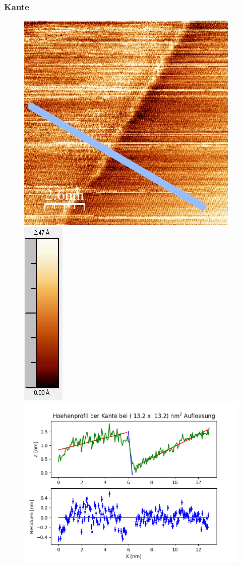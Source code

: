 \documentclass[12pt,a4paper]{article}
\begin{document}
\subsubsection{Kante}
\begin{figure}
\centering
\includegraphics[scale=0.6]{Bilder/Anhang/Kante/0132_Kante_vor.jpg}
\includegraphics[scale=0.6]{Bilder/Anhang/Kante/0132_Kante_vor_Skala.jpg}
\includegraphics[scale=0.6]{Bilder/Anhang/Kante/Profil_Kante_0132_vor.png}

\end{figure}
\end{document}
